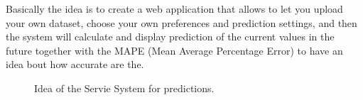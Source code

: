 Basically the idea is to create a web application that allows to let you upload your own dataset, choose your own preferences and prediction settings, and then the system will calculate and display prediction of the current values in the future together with the MAPE (Mean Average Percentage Error) to have an idea bout how accurate are the.\\


\begin{figure}[H]
	\centering
    \caption{Idea of the Servie System for predictions.}
\end{figure}






